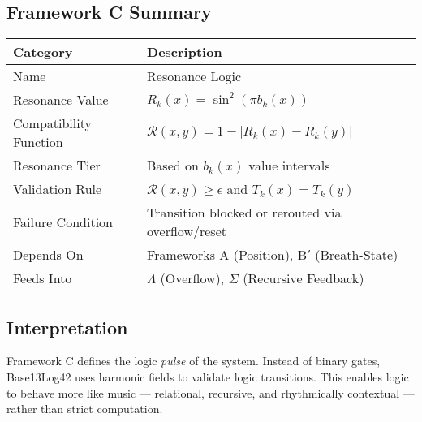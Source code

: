 \subsection*{Framework C Summary}

\begin{center}
\begin{tabular}{|l|l|}
\hline
\textbf{Category} & \textbf{Description} \\
\hline
Name & Resonance Logic \\
Resonance Value & $R_k(x) = \sin^2(\pi b_k(x))$ \\
Compatibility Function & $\mathcal{R}(x, y) = 1 - |R_k(x) - R_k(y)|$ \\
Resonance Tier & Based on $b_k(x)$ value intervals \\
Validation Rule & $\mathcal{R}(x, y) \geq \epsilon$ and $T_k(x) = T_k(y)$ \\
Failure Condition & Transition blocked or rerouted via overflow/reset \\
Depends On & Frameworks A (Position), B$'$ (Breath-State) \\
Feeds Into & $\Lambda$ (Overflow), $\Sigma$ (Recursive Feedback) \\
\hline
\end{tabular}
\end{center}

\subsection*{Interpretation}

Framework C defines the logic \emph{pulse} of the system. Instead of binary gates, Base13Log42 uses harmonic fields to validate logic transitions. This enables logic to behave more like music — relational, recursive, and rhythmically contextual — rather than strict computation.
